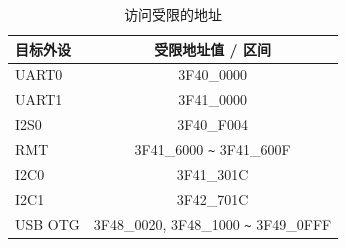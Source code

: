 \begin{longtable}[c]{ |l|c| }

  \caption{访问受限的地址}
  \label{table:Special_Registers_for_Dport_Bus}
	\\ \hline
  \rowcolor{lightgray}
  {目标外设} & {受限地址值 / 区间} \\\hline
    UART0     & \hexprefix{}3F40\_0000                                      \\\hline
    UART1     & \hexprefix{}3F41\_0000                                      \\\hline
    I2S0      & \hexprefix{}3F40\_F004                                      \\\hline
    RMT       & \hexprefix{}3F41\_6000 \verb+~+ \hexprefix{}3F41\_600F                \\\hline
    I2C0      & \hexprefix{}3F41\_301C                                      \\\hline
    I2C1      & \hexprefix{}3F42\_701C                                      \\\hline
    USB OTG      & \hexprefix{}3F48\_0020, \hexprefix{}3F48\_1000 \verb+~+ \hexprefix{}3F49\_0FFF  \\\hline
\end{longtable}



